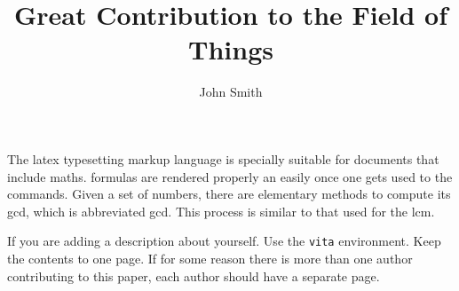 \documentclass{afitthesis}
\title{Great Contribution to the Field of Things}
\author{John Smith}
\begin{document}
\maketitle %







The \Gls{latex} typesetting markup language is specially suitable for
documents that include \gls{maths}. \Glspl{formula} are rendered properly an
easily once one gets used to the commands. Given a set of numbers, there are
elementary methods to compute its \acrlong{gcd}, which is abbreviated
\acrshort{gcd}. This process is similar to that used for the \acrfull{lcm}.

\appendix %



\clearpage
\printglossary[type=\acronymtype]
\printglossary

\nocite{*} %
\clearpage{} %
\printbibliography %

\begin{vita} %
    If you are adding a description about yourself. Use the \verb|vita|
    environment. Keep the contents to one page. If for some reason there is
    more than one author contributing to this paper, each author should have a
    separate page.
\end{vita}

\sfTwoNineEight
\end{document}
